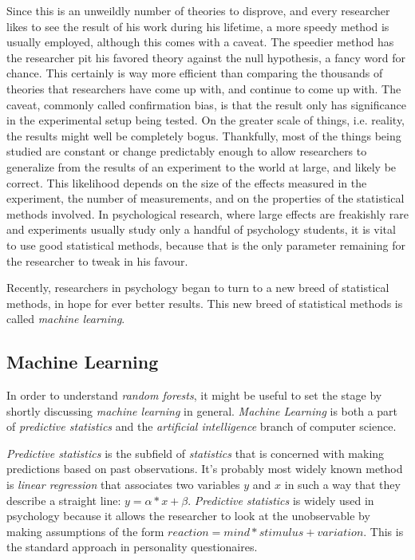 \documentclass[a4paper,man,12pt,apacite]{apa6} %
\begin{document}
Since this is an unweildly number of theories to disprove, and every
researcher likes to see the result of his work during his lifetime, a
more speedy method is usually employed, although this comes with a caveat.
The speedier method has the researcher pit his favored theory against
the null hypothesis, a fancy word for chance.
This certainly is way more efficient than comparing the thousands of
theories that researchers have come up with, and continue to come up with.
The caveat, commonly called confirmation bias, is that the result only
has significance in the experimental setup being tested.
On the greater scale of things, i.e. reality, the results might well be
completely bogus.
Thankfully, most of the things being studied are constant or change
predictably enough to allow researchers to generalize from the results
of an experiment to the world at large, and likely be correct.
This likelihood depends on the size of the effects measured in the
experiment, the number of measurements, and on the properties of the
statistical methods involved.
In psychological research, where large effects are freakishly rare and
experiments usually study only a handful of psychology students, it is
vital to use good statistical methods, because that is the only parameter
remaining for the researcher to tweak in his favour.

Recently, researchers in psychology began to turn to a new breed of
statistical methods, in hope for ever better results. This new breed of
statistical methods is called \emph{machine learning}.

\subsection{Machine Learning}
In order to understand \emph{random forests}, it might be useful to set
the stage by shortly discussing \emph{machine learning} in general.
\emph{Machine Learning} is both a part of \emph{predictive statistics}
and the \emph{artificial intelligence} branch of computer science.

\emph{Predictive statistics} is the subfield of \emph{statistics} that is
concerned with making predictions based on past observations.
It's probably most widely known method is \emph{linear regression} that
associates two variables \(y\) and \(x\) in such a way that they describe
a straight line: \(y = \alpha * x + \beta \).
\emph{Predictive statistics} is widely used in psychology because it
allows the researcher to look at the unobservable by making
assumptions of the form \(reaction = mind * stimulus + variation\).
This is the standard approach in personality questionaires.
\end{document}
